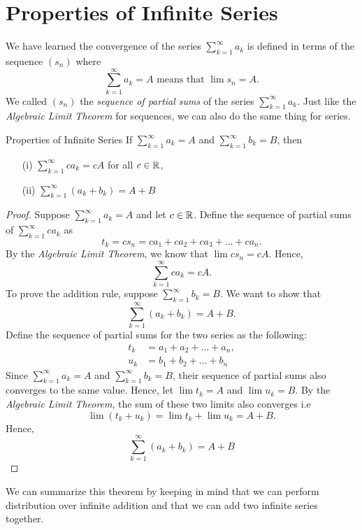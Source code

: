 \section{Properties of Infinite Series}

We have learned the convergence of the series \( \sum_{k=1}^{\infty} a_k \) is defined in terms of the sequence \( (s_n)\) where 
\[ \sum_{k=1}^{\infty} a_k = A \text{ means that } \lim s_n = A.\]
We called \( (s_n)\) the \textit{sequence of partial sums} of the series \( \sum_{k=1}^{\infty} a_k\). Just like the \textit{Algebraic Limit Theorem} for sequences, we can also do the same thing for series. 

\begin{theorem}{Properties of Infinite Series}{}
If \( \sum_{k=1}^{ \infty} a_k = A \) and \( \sum_{k=1}^{ \infty} b_k = B \), then 
\begin{enumerate}
    \item[(i)] \( \sum_{k=1}^{ \infty } ca_k = cA \) for all \( c \in \mathbb{R} \),
    \item[(ii)] \( \sum_{k=1}^{ \infty } (a_k + b_k) = A + B\)
\end{enumerate}
\end{theorem}

\begin{proof}
Suppose \( \sum_{k=1}^{\infty} a_k = A \) and let \( c \in \mathbb{R} \). Define the sequence of partial sums of \( \sum_{k=1}^{ \infty} ca_k \) as 
\[ t_k = cs_n =  ca_1 + ca_2 + ca_3 + ... + ca_n.\]
By the \textit{Algebraic Limit Theorem}, we know that \( \lim cs_n = cA \). Hence, 
\[ \sum_{k=1}^{\infty} ca_k = cA.\]
To prove the addition rule, suppose \( \sum_{k=1}^{ \infty} b_k = B \). We want to show that 
\[ \sum_{k=1}^{\infty} (a_k + b_k) = A + B.\]
Define the sequence of partial sums for the two series as the following:
\begin{align*}
    t_k &= a_1 + a_2 + ... + a_n, \\
    u_k &= b_1 + b_2 + ... + b_n
\end{align*}
Since \( \sum_{k=1}^{\infty} a_k = A \) and \( \sum_{k=1}^{\infty} b_k = B \), their sequence of partial sums also converges to the same value. Hence, let \( \lim t_k = A \) and \( \lim u_k = B \). By the \textit{Algebraic Limit Theorem}, the sum of these two limits also converges i.e  
\[ \lim ( t_k + u_k ) = \lim t_k + \lim u_k = A + B.\] 
Hence, 
\[ \sum_{k=1}^{\infty} (a_k + b_k) = A + B \]
\end{proof}

We can summarize this theorem by keeping in mind that we can perform distribution over infinite addition and that we can add two infinite series together. 

